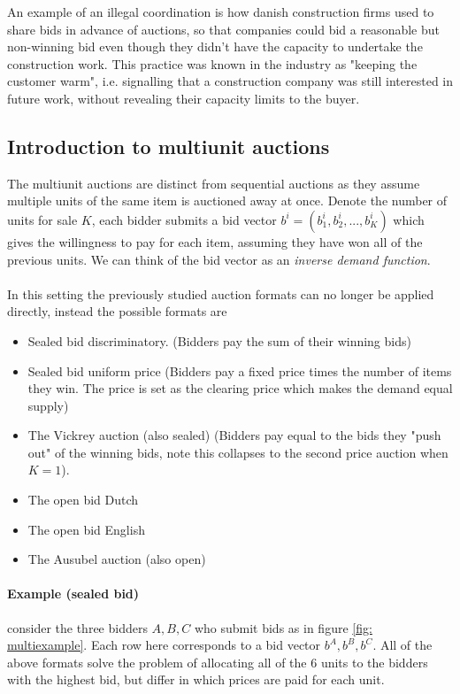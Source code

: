 An example of an illegal coordination is how danish construction firms used to share bids in advance of auctions, so that companies could bid a reasonable but non-winning bid even though they didn't have the capacity to undertake the construction work. This practice was known in the industry as "keeping the customer warm", i.e. signalling that a construction company was still interested in future work, without revealing their capacity limits to the buyer. 

\subsection{Introduction to multiunit auctions}
The multiunit auctions are distinct from sequential auctions as they assume multiple units of the same item is auctioned away at once. Denote the number of units for sale $K$, each bidder submits a bid vector $b^i=(b_1^i, b_2^i, ..., b_K^i)$ which gives the willingness to pay for each item, assuming they have won all of the previous units. We can think of the bid vector as an \textit{inverse demand function}.
\\ \\
In this setting the previously studied auction formats can no longer be applied directly, instead the possible formats are 
\begin{itemize}
    \item Sealed bid discriminatory.
    (Bidders pay the sum of their winning bids)
    \item Sealed bid uniform price 
    (Bidders pay a fixed price times the number of items they win. The price is set as the clearing price which makes the demand equal supply)
    \item The Vickrey auction (also sealed)
    (Bidders pay equal to the bids they "push out" of the winning bids, note this collapses to the second price auction when $K=1$).
    \item The open bid Dutch 
    \item The open bid English 
    \item The Ausubel auction (also open)
\end{itemize}

\paragraph{Example (sealed bid)} consider the three bidders $A,B,C$ who submit bids as in figure \ref{fig: multiexample}. Each row here corresponds to a bid vector $b^A, b^B, b^C$. All of the above formats solve the problem of allocating all of the 6 units to the bidders with the highest bid, but differ in which prices are paid for each unit. 

